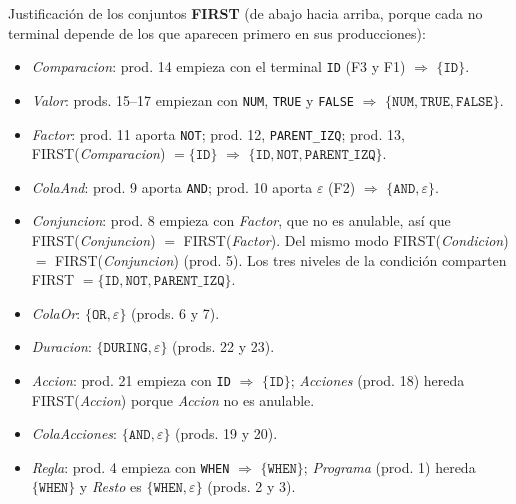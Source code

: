 \documentclass[11pt,letterpaper]{article}
\makeatletter
\renewcommand\subsection{\@startsection{subsection}{2}{\z@}{-2.6ex\@plus -1ex \@minus -.2ex}{1.0ex \@plus .2ex}%
  {\normalfont\large\bfseries}}
\newcommand{\T}[1]{\texttt{#1}}
\newcommand{\NT}[1]{\textit{#1}}
\newcommand{\eps}{\ensuremath{\varepsilon}}
\makeatother
\begin{document}
\subsection{Justificación de los conjuntos}\label{sec:justificacion}
\textbf{FIRST} (de abajo hacia arriba, porque cada no terminal depende de los que aparecen primero en sus
producciones):
\begin{itemize}
\item \NT{Comparacion}: prod. 14 empieza con el terminal \T{ID} (F3 y F1) $\Rightarrow$ $\{\T{ID}\}$.
\item \NT{Valor}: prods. 15--17 empiezan con \T{NUM}, \T{TRUE} y \T{FALSE} $\Rightarrow$ $\{\T{NUM}, \T{TRUE}, \T{FALSE}\}$.
\item \NT{Factor}: prod. 11 aporta \T{NOT}; prod. 12, \T{PARENT\_IZQ}; prod. 13, FIRST(\NT{Comparacion}) $=\{\T{ID}\}$
$\Rightarrow$ $\{\T{ID}, \T{NOT}, \T{PARENT\_IZQ}\}$.
\item \NT{ColaAnd}: prod. 9 aporta \T{AND}; prod. 10 aporta \eps{} (F2) $\Rightarrow$ $\{\T{AND}, \varepsilon\}$.
\item \NT{Conjuncion}: prod. 8 empieza con \NT{Factor}, que no es anulable, así que FIRST(\NT{Conjuncion}) $=$
FIRST(\NT{Factor}). Del mismo modo FIRST(\NT{Condicion}) $=$ FIRST(\NT{Conjuncion}) (prod. 5). Los tres niveles
de la condición comparten FIRST $= \{\T{ID}, \T{NOT}, \T{PARENT\_IZQ}\}$.
\item \NT{ColaOr}: $\{\T{OR}, \varepsilon\}$ (prods. 6 y 7).
\item \NT{Duracion}: $\{\T{DURING}, \varepsilon\}$ (prods. 22 y 23).
\item \NT{Accion}: prod. 21 empieza con \T{ID} $\Rightarrow$ $\{\T{ID}\}$; \NT{Acciones} (prod. 18) hereda
FIRST(\NT{Accion}) porque \NT{Accion} no es anulable.
\item \NT{ColaAcciones}: $\{\T{AND}, \varepsilon\}$ (prods. 19 y 20).
\item \NT{Regla}: prod. 4 empieza con \T{WHEN} $\Rightarrow$ $\{\T{WHEN}\}$; \NT{Programa} (prod. 1) hereda $\{\T{WHEN}\}$
y \NT{Resto} es $\{\T{WHEN}, \varepsilon\}$ (prods. 2 y 3).
\end{itemize}
\end{document}
